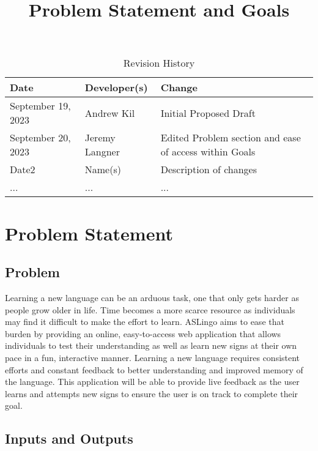 \documentclass{article}
\title{Problem Statement and Goals\\\progname}
\author{\authname}
\date{}
\begin{document}
\maketitle

\begin{table}[hp]
\caption{Revision History} \label{TblRevisionHistory}
\begin{tabularx}{\textwidth}{llX}
\toprule
\textbf{Date} & \textbf{Developer(s)} & \textbf{Change}\\
\midrule
September 19, 2023 & Andrew Kil & Initial Proposed Draft\\
September 20, 2023 & Jeremy Langner & Edited Problem section and ease of access within Goals\\
Date2 & Name(s) & Description of changes\\
... & ... & ...\\
\bottomrule
\end{tabularx}
\end{table}

\section{Problem Statement}



\subsection{Problem}

Learning a new language can be an arduous task, one that only gets harder as people grow older in life. Time becomes a more scarce resource as individuals may find it difficult to make the effort to learn. ASLingo aims to ease that burden by providing an online, easy-to-access web application that allows individuals to test their understanding as well as learn new signs at their own pace in a fun, interactive manner. Learning a new language requires consistent efforts and constant feedback to better understanding and improved memory of the language. This application will be able to provide live feedback as the user learns and attempts new signs to ensure the user is on track to complete their goal.

\subsection{Inputs and Outputs}
\end{document}
